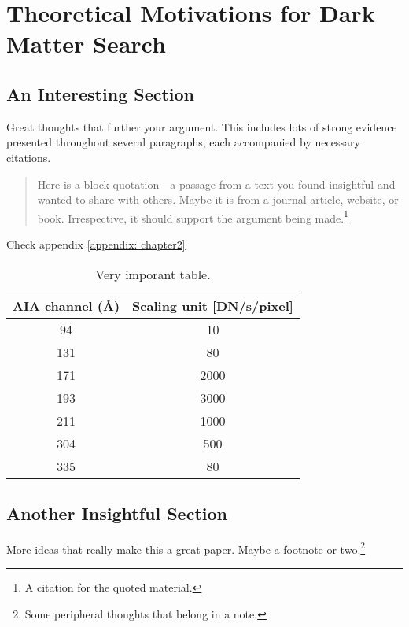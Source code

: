 \chapter{Theoretical Motivations for Dark Matter Search}
\label{chapter:two}
\section{An Interesting Section}

Great thoughts that further your argument. This includes lots of strong evidence presented throughout several paragraphs, each accompanied by necessary citations.
\begin{quotation}
    \noindent Here is a block quotation---a passage from a text you found insightful and wanted to share with others. Maybe it is from a journal article, website, or book. Irrespective, it should support the argument being made.\footnote{A citation for the quoted material.}
\end{quotation}

Check appendix \ref{appendix: chapter2}

\begin{table}[h!]
  \centering
  \caption{Very imporant table.}
  \label{tab:average_channels}
  \begin{tabular}{cc}
    \toprule
     AIA channel (\AA) &  Scaling unit [DN/s/pixel] \\
     \midrule
      94 &   10  \\
      131 &   80  \\
      171 & 2000  \\
      193 & 3000  \\
      211 & 1000  \\
      304 &  500  \\
      335 &   80  \\
      \bottomrule
  \end{tabular}
\end{table}


\section{Another Insightful Section}

More ideas that really make this a great paper. Maybe a footnote or two.\footnote{Some peripheral thoughts that belong in a note.}
